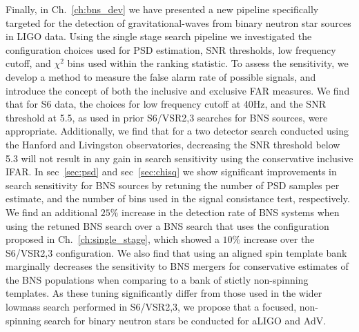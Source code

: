 Finally, in Ch.~\ref{ch:bns_dev} we have presented a new pipeline specifically targeted for the detection of gravitational-waves from binary neutron star sources in LIGO data. Using the single stage search pipeline we investigated the configuration choices used for PSD estimation, SNR thresholds, low frequency cutoff, and $\chi^2$ bins used within the ranking statistic. To assess the sensitivity, we develop a method to measure the false alarm rate of possible signals, and introduce the concept of both the inclusive and exclusive FAR measures. We find that for S6 data, the choices for low frequency cutoff at 40Hz, and the SNR threshold at 5.5, as used in prior S6/VSR2,3 searches for BNS sources, were appropriate. Additionally, we find that for a two detector search conducted using the Hanford and Livingston observatories, decreasing the SNR threshold below 5.3 will not result in any gain in search sensitivity using the conservative inclusive IFAR. In sec~\ref{sec:psd} and sec~\ref{sec:chisq} we show significant improvements in search sensitivity for BNS sources by retuning the number of PSD samples per estimate, and the number of bins used in the signal consistance test, respectively. We find an additional $25\%$ increase in the detection rate of BNS systems when using the retuned BNS search over a BNS search that uses the configuration proposed in Ch.~\ref{ch:single_stage}, which showed a $10\%$ increase over the S6/VSR2,3 configuration. We also find that using an aligned spin template bank marginally decreases the sensitivity 
to BNS mergers for conservative estimates of the BNS populations when comparing to a bank of stictly non-spinning templates. As these tuning significantly differ from those used in the wider lowmass search performed in S6/VSR2,3, we propose that a focused, non-spinning search for binary neutron stars be conducted for aLIGO and AdV.
